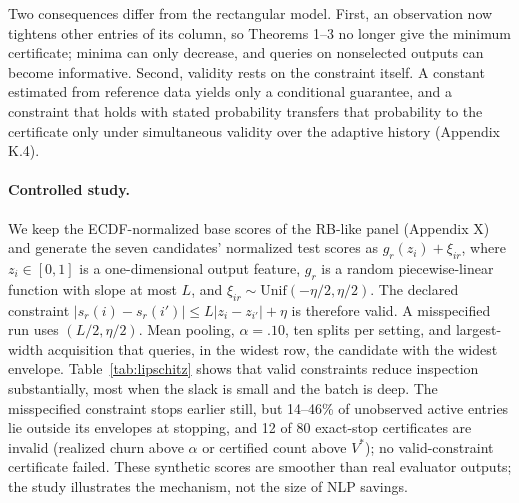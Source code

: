 \documentclass[11pt]{article}
\begin{document}
Two consequences differ from the rectangular model. First, an observation now tightens other entries of its column, so Theorems 1--3 no longer give the minimum certificate; minima can only decrease, and queries on nonselected outputs can become informative. Second, validity rests on the constraint itself. A constant estimated from reference data yields only a conditional guarantee, and a constraint that holds with stated probability transfers that probability to the certificate only under simultaneous validity over the adaptive history (Appendix K.4).

\paragraph{Controlled study.} We keep the ECDF-normalized base scores of the RB-like panel (Appendix X) and generate the seven candidates' normalized test scores as $g_r(z_i)+\xi_{ir}$, where $z_i\in[0,1]$ is a one-dimensional output feature, $g_r$ is a random piecewise-linear function with slope at most $L$, and $\xi_{ir}\sim\mathrm{Unif}(-\eta/2,\eta/2)$. The declared constraint $|s_r(i)-s_r(i')|\le L|z_i-z_{i'}|+\eta$ is therefore valid. A misspecified run uses $(L/2,\eta/2)$. Mean pooling, $\alpha=.10$, ten splits per setting, and largest-width acquisition that queries, in the widest row, the candidate with the widest envelope. Table~\ref{tab:lipschitz} shows that valid constraints reduce inspection substantially, most when the slack is small and the batch is deep. The misspecified constraint stops earlier still, but 14--46\% of unobserved active entries lie outside its envelopes at stopping, and 12 of 80 exact-stop certificates are invalid (realized churn above $\alpha$ or certified count above $V^*$); no valid-constraint certificate failed. These synthetic scores are smoother than real evaluator outputs; the study illustrates the mechanism, not the size of NLP savings.
\end{document}
